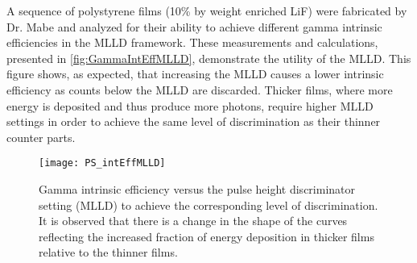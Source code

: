 A sequence of polystyrene films (10\% by weight enriched LiF) were fabricated by Dr. Mabe and analyzed for their ability to achieve different gamma intrinsic efficiencies in the MLLD framework.
These measurements and calculations, presented in \autoref{fig:GammaIntEffMLLD}, demonstrate the utility of the MLLD.
This figure shows, as expected, that increasing the MLLD causes a lower intrinsic efficiency as counts below the MLLD are discarded.
Thicker films, where more energy is deposited and thus produce more photons, require higher MLLD settings in order to achieve the same level of discrimination as their thinner counter parts.
\begin{figure}
  \centering
    \texttt{[image: PS\_intEffMLLD]}
  \caption[Intrinsic efficiency achieved at various discriminator settings]{Gamma intrinsic efficiency versus the pulse height discriminator setting (MLLD) to achieve the corresponding level of discrimination. It is observed that there is a change in the shape of the curves reflecting the increased fraction of energy deposition in thicker films relative to the thinner films.}
  \label{fig:GammaIntEffMLLD}
\end{figure}

